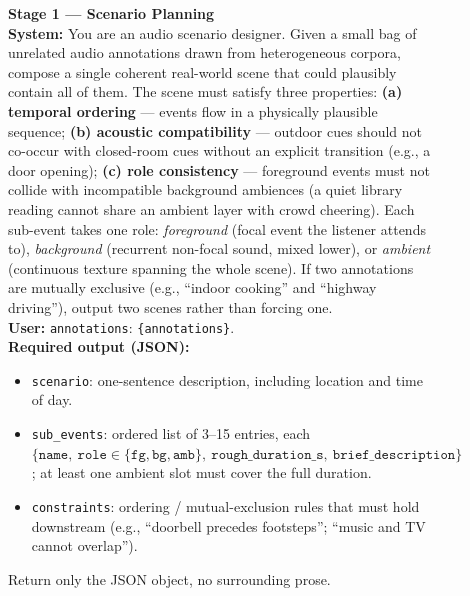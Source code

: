 \documentclass{llmxive}
\begin{document}
\begin{figure}[!htbp]
\centering
\begin{tcolorbox}[
  colback=promptbg, colbacktitle=promptbg, colframe=promptframe,
  coltitle=black,
  title=\textbf{Prompt Template (Hierarchical Event Curation, Part 1)},
  fonttitle=\bfseries,
  boxrule=0.5pt, arc=2pt,
  fontupper=\scriptsize,
  left=8pt, right=8pt, top=4pt, bottom=4pt
]
\textbf{Stage 1 --- Scenario Planning}\\[1pt]
\textbf{System:} You are an audio scenario designer. Given a small bag of
unrelated audio annotations drawn from heterogeneous corpora, compose
a single coherent real-world scene that could plausibly contain all of
them. The scene must satisfy three properties: \textbf{(a) temporal
ordering} --- events flow in a physically plausible sequence;
\textbf{(b) acoustic compatibility} --- outdoor cues should not co-occur
with closed-room cues without an explicit transition (e.g., a door
opening); \textbf{(c) role consistency} --- foreground events must not
collide with incompatible background ambiences (a quiet library reading
cannot share an ambient layer with crowd cheering). Each sub-event takes
one role: \textit{foreground} (focal event the listener attends to),
\textit{background} (recurrent non-focal sound, mixed lower), or
\textit{ambient} (continuous texture spanning the whole scene). If two
annotations are mutually exclusive (e.g., ``indoor cooking'' and
``highway driving''), output two scenes rather than forcing one.\\[2pt]
\textbf{User:} \texttt{annotations}: \verb|{annotations}|.\\[2pt]
\textbf{Required output (JSON):}
\begin{itemize}\setlength\itemsep{0pt}\setlength\topsep{0pt}
  \item \texttt{scenario}: one-sentence description, including location
        and time of day.
  \item \texttt{sub\_events}: ordered list of 3--15 entries, each
        $\{\texttt{name},\ \texttt{role}\!\in\!
         \{\texttt{fg},\texttt{bg},\texttt{amb}\},\
         \texttt{rough\_duration\_s},\ \texttt{brief\_description}\}$;
        at least one ambient slot must cover the full duration.
  \item \texttt{constraints}: ordering / mutual-exclusion rules that
        must hold downstream (e.g., ``doorbell precedes footsteps'';
        ``music and TV cannot overlap'').
\end{itemize}
Return only the JSON object, no surrounding prose.


\end{tcolorbox}
\end{figure}
\end{document}
